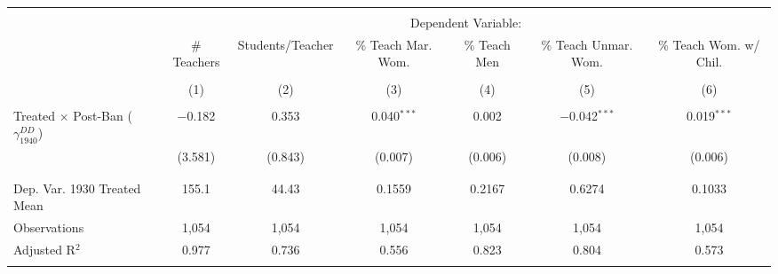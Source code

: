 
\begin{tabular}{@{\extracolsep{5pt}}lcccccc} 
\\[-1.8ex]\hline 
\hline \\[-1.8ex] 
 & \multicolumn{6}{c}{Dependent Variable:} \\ 
\cline{2-7} 
 & \# Teachers & Students/Teacher & \% Teach Mar. Wom. & \% Teach Men & \% Teach Unmar. Wom. & \% Teach Wom. w/ Chil. \\ 
\\[-1.8ex] & (1) & (2) & (3) & (4) & (5) & (6)\\ 
\hline \\[-1.8ex] 
 Treated $\times$ Post-Ban ($\gamma_{1940}^{DD}$) & $-$0.182 & 0.353 & 0.040$^{***}$ & 0.002 & $-$0.042$^{***}$ & 0.019$^{***}$ \\ 
  & (3.581) & (0.843) & (0.007) & (0.006) & (0.008) & (0.006) \\ 
  & & & & & & \\ 
\hline \\[-1.8ex] 
Dep. Var. 1930 Treated Mean & 155.1 & 44.43 & 0.1559 & 0.2167 & 0.6274 & 0.1033 \\ 
Observations & 1,054 & 1,054 & 1,054 & 1,054 & 1,054 & 1,054 \\ 
Adjusted R$^{2}$ & 0.977 & 0.736 & 0.556 & 0.823 & 0.804 & 0.573 \\ 
\hline 
\hline \\[-1.8ex] 
\end{tabular} 
